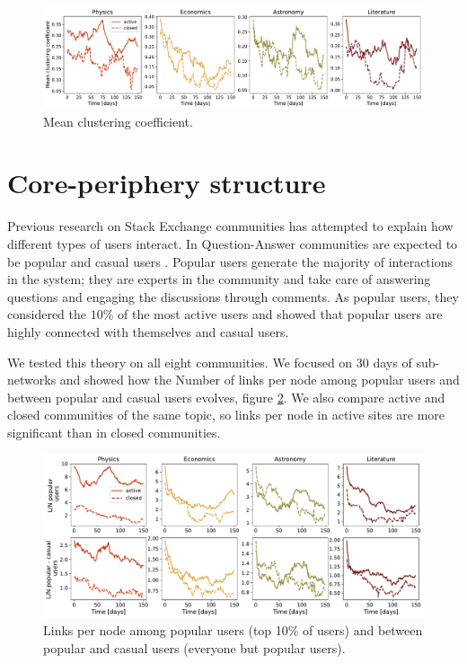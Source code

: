 \begin{figure}
	\centering
	\includegraphics[width=\linewidth]{figures/stackexchange/clustering.pdf}%
	\caption{Mean clustering coefficient.}
	\label{fig:clustering}
\end{figure}

\section{Core-periphery structure}

Previous research on Stack Exchange communities has attempted to explain how different types of users interact. In Question-Answer communities are expected to be popular and casual users \cite{santos2019activity, santos2019self}. Popular users generate the majority of interactions in the system; they are experts in the community and take care of answering questions and engaging the discussions through comments. As popular users, they considered the $10 \%$ of the most active users and showed that popular users are highly connected with themselves and casual users.

We tested this theory on all eight communities. We focused on 30 days of sub-networks and showed how the Number of links per node among popular users and between popular and casual users evolves, figure \ref{fig:pop_cas_users}. We also compare active and closed communities of the same topic, so links per node in active sites are more significant than in closed communities.

\begin{figure}[h!]
	\centering
	\includegraphics[width=\linewidth]{figures/stackexchange/popular_casual_users.pdf}
	\caption[Number of links per node]{Links per node among popular users (top 10\% of users) and between popular and casual users (everyone but popular users).}
	\label{fig:pop_cas_users}
\end{figure} 

